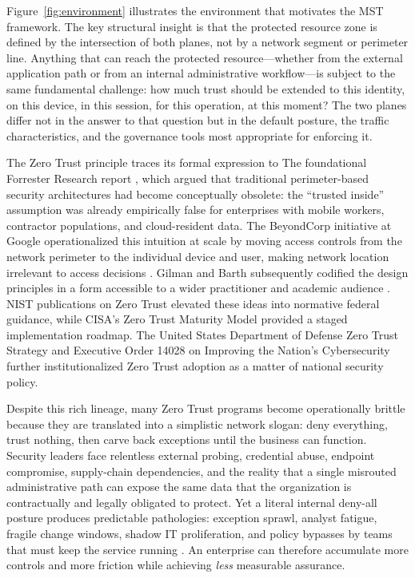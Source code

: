 \documentclass[acmlarge]{acmart}
\begin{document}
Figure~\ref{fig:environment} illustrates the environment that motivates the MST
framework. The key structural insight is that the protected resource zone is defined
by the intersection of both planes, not by a network segment or perimeter line.
Anything that can reach the protected resource---whether from the external application
path or from an internal administrative workflow---is subject to the same fundamental
challenge: how much trust should be extended to this identity, on this device, in this
session, for this operation, at this moment? The two planes differ not in the answer to
that question but in the default posture, the traffic characteristics, and the
governance tools most appropriate for enforcing it.

The Zero Trust principle traces its formal expression to The foundational Forrester Research report \cite{kindervag2010}, which argued that traditional perimeter-based security
architectures had become conceptually obsolete: the ``trusted inside'' assumption was already
empirically false for enterprises with mobile workers, contractor populations, and
cloud-resident data. The BeyondCorp initiative at Google operationalized this intuition at
scale by moving access controls from the network perimeter to the individual device and user,
making network location irrelevant to access decisions \cite{ward2014beyondcorp,osborn2016beyondcorp}. Gilman and Barth subsequently codified the design principles in a
form accessible to a wider practitioner and academic audience \cite{gilman2017}. NIST publications on Zero Trust \cite{rose2020,chandramouli2023} elevated these ideas into normative federal guidance, while CISA's
Zero Trust Maturity Model \cite{cisa2023} provided a staged implementation roadmap. The United States Department of Defense Zero Trust Strategy \cite{dod2022} and Executive Order
14028 on Improving the Nation's Cybersecurity \cite{eo14028} further institutionalized Zero
Trust adoption as a matter of national security policy.

Despite this rich lineage, many Zero Trust programs become operationally brittle because they
are translated into a simplistic network slogan: deny everything, trust nothing, then carve
back exceptions until the business can function. Security leaders face relentless external
probing, credential abuse, endpoint compromise, supply-chain dependencies, and the reality
that a single misrouted administrative path can expose the same data that the organization is
contractually and legally obligated to protect. Yet a literal internal deny-all posture
produces predictable pathologies: exception sprawl, analyst fatigue, fragile change windows,
shadow IT proliferation, and policy bypasses by teams that must keep the service running
\cite{buck2021}. An enterprise can therefore accumulate more controls and more friction while
achieving \textit{less} measurable assurance.
\end{document}
